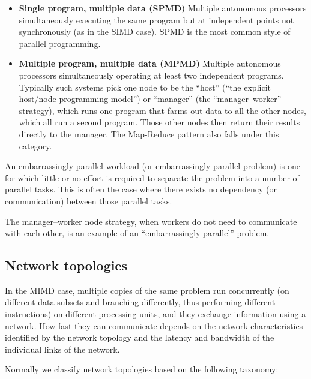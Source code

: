 \documentclass[justified,sixbynine]{tufte-book}
\theoremstyle{plain}%
\theoremstyle{definition}
\theoremstyle{remark}
\begin{document}
\begin{fullwidth}
\begin{itemize}
\item {\bf Single program, multiple data (SPMD)}
Multiple autonomous processors simultaneously executing the same program but at independent points not synchronously (as in the SIMD case). SPMD is the most common style of parallel programming.

\item {\bf Multiple program, multiple data (MPMD)}
Multiple autonomous processors simultaneously operating at least two independent programs. Typically such systems pick one node to be the ``host'' (``the explicit host/node programming model'') or ``manager'' (the ``manager--worker'' strategy), which runs one program that farms out data to all the other nodes, which all run a second program. Those other nodes then return their results directly to the manager. The Map-Reduce pattern also falls under this category.
\end{itemize}

An embarrassingly parallel workload (or embarrassingly parallel problem) is one for which little or no effort is required to separate the problem into a number of parallel tasks. This is often the case where there exists no dependency (or communication) between those parallel tasks.

The manager--worker node strategy, when workers do not need to communicate with each other, is an example of an ``embarrassingly parallel'' problem.


\goodbreak\subsection{Network topologies}


In the MIMD case, multiple copies of the same problem run concurrently (on different data subsets and branching differently, thus performing different instructions) on different processing units, and they exchange information using a network. How fast they can communicate depends on the network characteristics identified by the network topology and the latency and bandwidth of the individual links of the network.

Normally we classify network topologies based on the following taxonomy:


\end{fullwidth}
\end{document}
